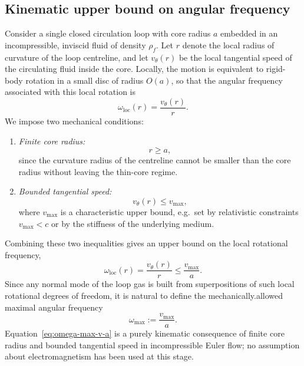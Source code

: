 \documentclass[11pt]{article}
\begin{document}
        \subsection{Kinematic upper bound on angular frequency}

            Consider a single closed circulation loop with core radius $a$ embedded in an
            incompressible, inviscid fluid of density $\rho_f$. Let $r$ denote the local radius of
            curvature of the loop centreline, and let $v_\theta(r)$ be the local tangential speed of
            the circulating fluid inside the core. Locally, the motion is equivalent to rigid-body
            rotation in a small disc of radius $O(a)$, so that the angular frequency associated with
            this local rotation is
            \begin{equation}
                \omega_{\text{loc}}(r) = \frac{v_\theta(r)}{r}.
            \end{equation}
            We impose two mechanical conditions:
            \begin{enumerate}
                \item \emph{Finite core radius:}
                \begin{equation}
                    r \ge a,
                \end{equation}
                since the curvature radius of the centreline cannot be smaller than the core
                radius without leaving the thin-core regime.
                \item \emph{Bounded tangential speed:}
                \begin{equation}
                    v_\theta(r) \le v_{\max},
                \end{equation}
                where $v_{\max}$ is a characteristic upper bound, e.g.\ set by relativistic
                constraints $v_{\max}<c$ or by the stiffness of the underlying medium.
            \end{enumerate}
            Combining these two inequalities gives an upper bound on the local rotational frequency,
            \begin{equation}
                \omega_{\text{loc}}(r) = \frac{v_\theta(r)}{r}
                \le \frac{v_{\max}}{a}.
            \end{equation}
            Since any normal mode of the loop gas is built from superpositions of such local
            rotational degrees of freedom, it is natural to define the mechanically.allowed maximal
            angular frequency
            \begin{equation}
                \omega_{\max} := \frac{v_{\max}}{a}.
                \label{eq:omega-max-v-a}
            \end{equation}
            Equation~\eqref{eq:omega-max-v-a} is a purely kinematic consequence of finite core radius
            and bounded tangential speed in incompressible Euler flow; no assumption about
            electromagnetism has been used at this stage.
\end{document}
